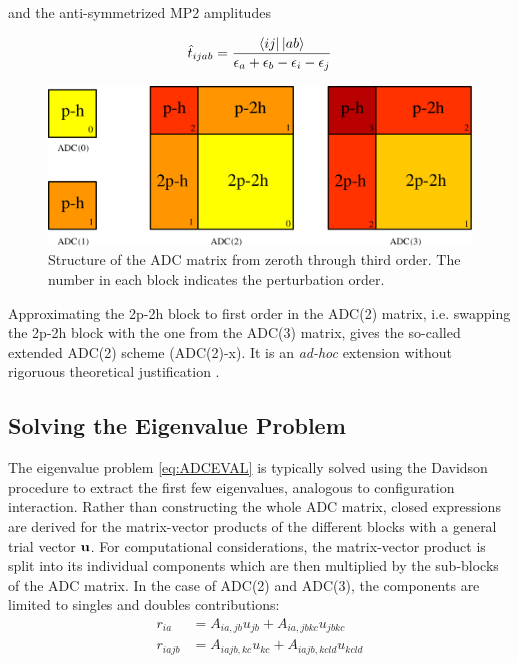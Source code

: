 and the anti-symmetrized MP2 amplitudes

\begin{equation}
\hat{t}_{ijab} = \frac{\sbra{ij}\sket{ab}}{\eps_a + \eps_b - \eps_i - \eps_j}
\end{equation}

\begin{figure}
\centering
\includegraphics[scale=0.4]{Pics/ADCMAT2}
\caption{Structure of the ADC matrix from zeroth through third order. The number in each block indicates the perturbation order.}
\label{fig:ADCMAT}
\end{figure}

Approximating the 2p-2h block to first order in the ADC(2) matrix, i.e. swapping the 2p-2h block with the one from the ADC(3) matrix, gives the so-called extended ADC(2) scheme (ADC(2)-x). It is an \emph{ad-hoc} extension without rigoruous theoretical justification \cite{Tro1995}.  

\subsection{Solving the Eigenvalue Problem \label{sec:ADC_DAV}}

The eigenvalue problem \ref{eq:ADCEVAL} is typically solved using the Davidson procedure to extract the first few eigenvalues, analogous to configuration interaction. Rather than constructing the whole ADC matrix, closed expressions are derived for the matrix-vector products of the different blocks with a general trial vector $\mathbf{u}$. For computational considerations, the matrix-vector product is split into its individual components which are then multiplied by the sub-blocks of the ADC matrix. In the case of ADC(2) and ADC(3), the components are limited to singles and doubles contributions:
\begin{align}
r_{ia} &= A_{ia,jb} u_{jb} + A_{ia,jbkc} u_{jbkc} \\
r_{iajb} &= A_{iajb,kc} u_{kc} + A_{iajb,kcld} u_{kcld} 
\end{align}

